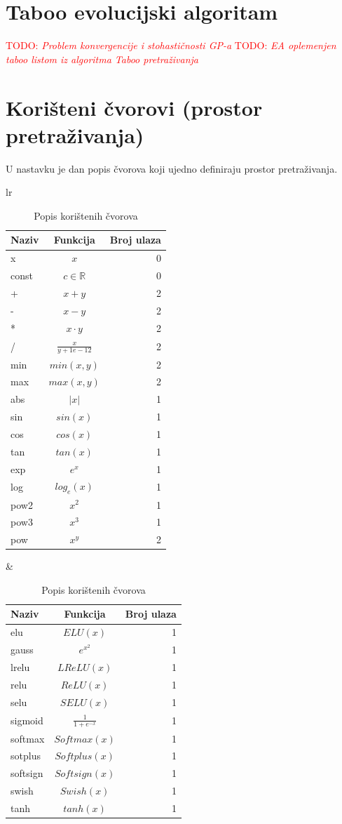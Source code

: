 \documentclass[times, utf8, diplomski]{fer}
\def\realnum{\mathbb{R}}
\def\TODO#1{\noindent\textcolor{red}{TODO: \textit{#1}}\newline}
\def\todo#1{\TODO{#1}}
\begin{document}
\section{Taboo evolucijski algoritam}
\todo{Problem konvergencije i stohastičnosti GP-a}
\todo{EA oplemenjen taboo listom iz algoritma Taboo pretraživanja}

\section{Korišteni čvorovi (prostor pretraživanja)}
U nastavku je dan popis čvorova koji ujedno definiraju prostor pretraživanja.

\begin{table}
\begin{tabular}[t]{lr}
\begin{tabular}[t]{l|c|r}
\textbf{Naziv} & \textbf{Funkcija} & \textbf{Broj ulaza} \\
\hline
x		& $x$					& 0 \\
const	& $c \in \realnum$		& 0 \\
\hline
+		& $x + y$				& 2 \\
-		& $x - y$				& 2 \\
*		& $x \cdot y$			& 2 \\
/		& $\frac{x}{y + 1e-12}$	& 2 \\
\hline
min		& $min(x, y)$			& 2 \\
max		& $max(x, y)$			& 2 \\
abs		& $|x|$					& 1 \\
\hline
sin		& $sin(x)$				& 1 \\
cos		& $cos(x)$				& 1 \\
tan		& $tan(x)$				& 1 \\
\hline
exp		& $e^x$					& 1 \\
log		& $log_e(x)$				& 1 \\
pow2		& $x^2$					& 1 \\
pow3		& $x^3$					& 1 \\
pow		& $x^y$					& 2 \\
\end{tabular}
& \quad
\begin{tabular}[t]{l|c|r}
\textbf{Naziv} & \textbf{Funkcija} & \textbf{Broj ulaza} \\
\hline
elu		& $ELU(x)$				& 1 \\
gauss	& $e^{x^2}$				& 1 \\
lrelu	& $LReLU(x)$				& 1 \\
relu		& $ReLU(x)$				& 1 \\
selu		& $SELU(x)$				& 1 \\
sigmoid	& $\frac{1}{1+e^{-x}}$	& 1 \\
softmax	& $Softmax(x)$			& 1 \\
sotplus	& $Softplus(x)$			& 1 \\
softsign	& $Softsign(x)$			& 1 \\
swish	& $Swish(x)$				& 1 \\
tanh		& $tanh(x)$				& 1 \\
\end{tabular}
\end{tabular}
\caption{Popis korištenih čvorova}
\end{table}
\end{document}
